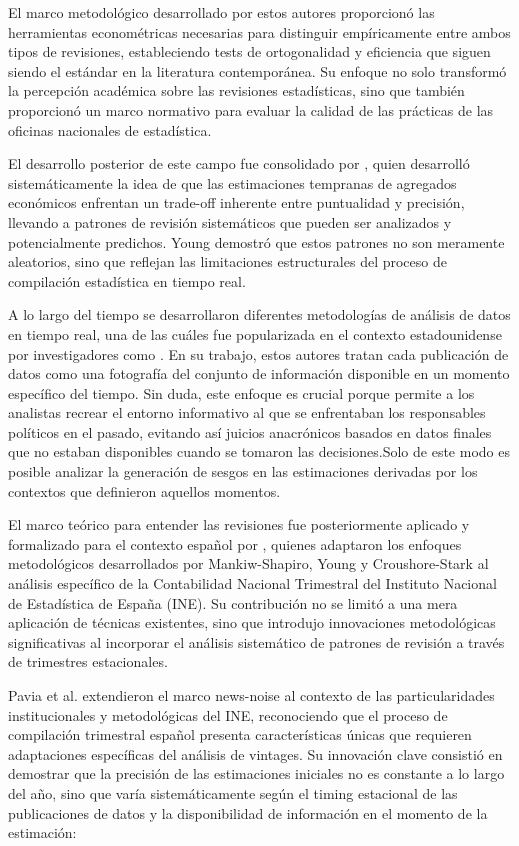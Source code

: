 \documentclass{article}
\begin{document}
El marco metodológico desarrollado por estos autores proporcionó las herramientas econométricas necesarias para distinguir empíricamente entre ambos tipos de revisiones, estableciendo tests de ortogonalidad y eficiencia que siguen siendo el estándar en la literatura contemporánea. Su enfoque no solo transformó la percepción académica sobre las revisiones estadísticas, sino que también proporcionó un marco normativo para evaluar la calidad de las prácticas de las oficinas nacionales de estadística.

El desarrollo posterior de este campo fue consolidado por \citet{young1993}, quien desarrolló sistemáticamente la idea de que las estimaciones tempranas de agregados económicos enfrentan un trade-off inherente entre puntualidad y precisión, llevando a patrones de revisión sistemáticos que pueden ser analizados y potencialmente predichos. Young demostró que estos patrones no son meramente aleatorios, sino que reflejan las limitaciones estructurales del proceso de compilación estadística en tiempo real.

A lo largo del tiempo se desarrollaron diferentes metodologías de análisis de datos en tiempo real, una de las cuáles fue popularizada en el contexto estadounidense por investigadores como \citet{croushore2001}. En su trabajo, estos autores tratan cada publicación de datos como una fotografía del conjunto de información disponible en un momento específico del tiempo. Sin duda, este enfoque es crucial porque permite a los analistas recrear el entorno informativo al que se enfrentaban los responsables políticos en el pasado, evitando así juicios anacrónicos basados en datos finales que no estaban disponibles cuando se tomaron las decisiones.Solo de este modo es posible analizar la generación de sesgos en las estimaciones derivadas por los contextos que definieron aquellos momentos.

El marco teórico para entender las revisiones fue posteriormente aplicado y formalizado para el contexto español por \citet{pavia2017}, quienes adaptaron los enfoques metodológicos desarrollados por Mankiw-Shapiro, Young y Croushore-Stark al análisis específico de la Contabilidad Nacional Trimestral del Instituto Nacional de Estadística de España (INE). Su contribución no se limitó a una mera aplicación de técnicas existentes, sino que introdujo innovaciones metodológicas significativas al incorporar el análisis sistemático de patrones de revisión a través de trimestres estacionales.

Pavia et al. extendieron el marco news-noise al contexto de las particularidades institucionales y metodológicas del INE, reconociendo que el proceso de compilación trimestral español presenta características únicas que requieren adaptaciones específicas del análisis de vintages. Su innovación clave consistió en demostrar que la precisión de las estimaciones iniciales no es constante a lo largo del año, sino que varía sistemáticamente según el timing estacional de las publicaciones de datos y la disponibilidad de información en el momento de la estimación:
\end{document}
